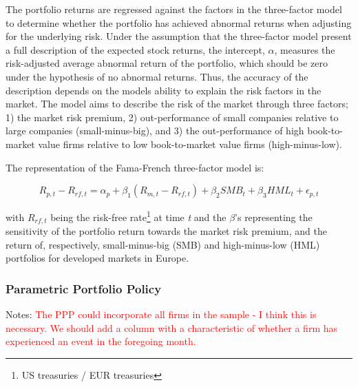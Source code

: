 The portfolio returns are regressed against the factors in the \cite{Fama_french_3fac} three-factor model to determine whether the portfolio has achieved abnormal returns when adjusting for the underlying risk. Under the assumption that the three-factor model present a full description of the expected stock returns, the intercept, $\alpha$, measures the risk-adjusted average abnormal return of the portfolio, which should be zero under the hypothesis of no abnormal returns. Thus, the accuracy of the description depends on the models ability to explain the risk factors in the market. The model aims to describe the risk of the market through three factors; 1) the market risk premium, 2) out-performance of small companies relative to large companies (small-minus-big), and 3) the out-performance of high book-to-market value firms  relative to low book-to-market value firms (high-minus-low). 

The representation of the Fama-French three-factor model is:

\begin{equation} \label{eq: FF5}
    R_{p,t} - R_{rf,t} = \alpha_p + \beta_1(R_{m,t} - R_{rf,t}) + \beta_2 SMB_t + \beta_3 HML_t + \epsilon_{p,t} 
\end{equation}

with $R_{rf,t}$ being the risk-free rate\footnote{US treasuries / EUR treasuries} at time \textit{t} and the $\beta$'s representing the sensitivity of the portfolio return towards the market risk premium, and the return of, respectively, small-minus-big (SMB) and high-minus-low (HML) portfolios for developed markets in Europe.   

\subsubsection{Parametric Portfolio Policy}

Notes:
\textcolor{red}{The PPP could incorporate all firms in the sample - I think this is necessary. We should add a column with a characteristic of whether a firm has experienced an event in the foregoing month.}
